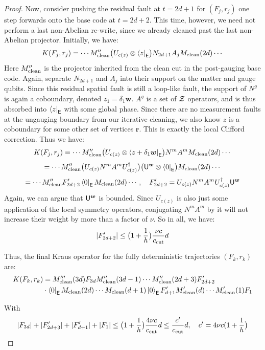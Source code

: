 \documentclass[11pt]{article}
\begin{document}
\begin{proof}
    Now, consider pushing the residual fault at $t = 2d+1$ for $(F_j, r_j)$ one step forwards onto the base code at $t = 2d+2$. This time, however, we need not perform a last non-Abelian re-write, since we already cleaned past the last non-Abelian projector. Initially, we have:
    \[
    K(F_j, r_j) = \cdots M''_{\rm clean}\bigl ( U_{c(z)} \otimes \bra{z}_{\mathsf{E}} \bigr ) N_{2d+1} A_j M_{\rm clean}(2d) \cdots 
    \]
    Here $M''_{\rm clean}$ is the projector inherited from the clean cut in the post-gauging base code. Again, separate $N_{2d+1}$ and $A_j$ into their support on the matter and gauge qubits. Since this residual spatial fault is still a loop-like fault, the support of $N^g$ is again a coboundary, denoted $z_1 = \delta_1 \bm{w}$. $A^g$ is a set of $\mathcal{Z}$ operators, and is thus absorbed into $\bra{z}_{\mathsf{E}}$ with some global phase. Since there are no measurement faults at the ungauging boundary from our iterative cleaning, we also know $z$ is a coboundary for some other set of vertices $\bm{r}$. This is exactly the local Clifford correction. Thus we have:
    \[
    K(F_j, r_j) = \cdots M''_{\rm clean}\bigl ( U_{c(z)} \otimes \bra{z + \delta_1 \bm{w}}_{\mathsf{E}} \bigr ) N^m A^m M_{\rm clean}(2d) \cdots
    \]
    \[
    = \cdots M''_{\rm clean} \bigl ( U_{c(z)} N^m A^m U_{c(z)}^\dagger \bigr ) \bigl ( \mathsf{U}^{\bm w} \otimes \bra{0}_{\mathsf{E}} \bigr )  M_{\rm clean}(2d) \cdots 
    \]
    \[
    = \cdots M''_{\rm clean} F'_{2d+2} \bra{0}_{\mathsf{E}} M_{\rm clean}(2d) \cdots , \quad F'_{2d+2} =  U_{c(z)} N^m A^m U_{c(z)}^\dagger \mathsf{U}^{\bm w}
    \]
    Again, we can argue that $\mathsf{U}^{\bm w}$ is bounded. Since $U_{c(z)}$ is also just some application of the local symmetry operators, conjugating $N^m A^m$ by it will not increase their weight by more than a factor of $\nu$. So in all, we have:
    \[
    |F'_{2d+2}| \leq \bigl( 1 + \frac{1}{h} \bigr) \frac{\nu c}{c_{\rm cut}} d
    \]

    Thus, the final Kraus operator for the fully deterministic trajectories $(F_k, r_k)$ are:
    \begin{align}
        K(F_k, r_k) &= M'''_{\rm clean}(3d) F_{3d} M''_{\rm clean}(3d-1) \cdots M''_{\rm clean}(2d+3) F'_{2d+2} \notag \\
        &\cdot \bra{0}_{\mathsf{E}} M_{\rm clean}(2d) \cdots M_{\rm clean}(d+1) \ket{0}_{\mathsf{E}} F'_{d+1} M'_{\rm clean}(d) \cdots M'_{\rm clean}(1) F_1 \notag
    \end{align}

    With 
    \[
    |F_{3d}| + |F'_{2d+3}| + |F'_{d+1}| + |F_1| \leq \bigl ( 1 + \frac{1}{h} \bigr ) \frac{4 \nu c}{c_{\rm cut}} d \leq \frac{c'}{c_{\rm cut}} d, \quad c' = 4 \nu c ( 1 + \frac{1}{h} \bigr ) 
    \]
    
\end{proof}
\end{document}

